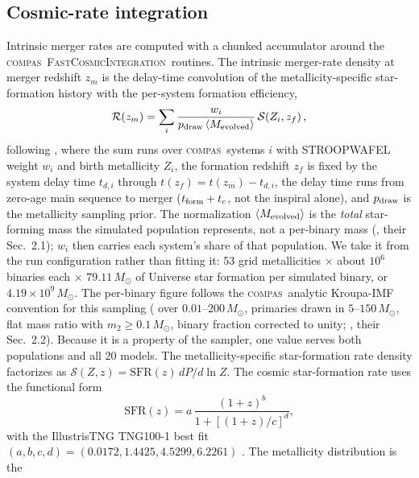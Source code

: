 \documentclass[twocolumn,apj]{openjournal}
\newcommand{\Msun}{M_\odot}
\newcommand{\compas}{\textsc{compas}}
\newcommand{\fci}{\textsc{FastCosmicIntegration}}
\begin{document}
\subsection{Cosmic-rate integration} \label{sec:cosmicrate}

Intrinsic merger rates are computed with a chunked accumulator around the
\compas\ \fci\ routines. The intrinsic merger-rate density at merger redshift
$z_m$ is the delay-time convolution of the metallicity-specific star-formation
history with the per-system formation efficiency,
\begin{equation}
\mathcal{R}(z_m) = \sum_i \frac{w_i}{p_{\rm draw}\,\langle M_{\rm evolved}\rangle}\,
\mathcal{S}\!\left(Z_i, z_f\right),
\label{eq:rate}
\end{equation}
following \citet[their Eq.~1]{neijssel2019}, where the sum runs over \compas\
systems $i$ with STROOPWAFEL weight $w_i$ and birth metallicity $Z_i$, the
formation redshift $z_f$ is fixed by the system delay time $t_{d,i}$ through
$t(z_f) = t(z_m) - t_{d,i}$, the delay time runs from zero-age main sequence to
merger ($t_{\rm form} + t_c$, not the inspiral alone), and $p_{\rm draw}$ is the
metallicity sampling prior. The normalization $\langle M_{\rm evolved}\rangle$
is the \emph{total} star-forming mass the simulated population represents, not a
per-binary mass (\citealt{neijssel2019}, their Sec.~2.1); $w_i$ then carries each
system's share of that population. We take it from the run configuration rather
than fitting it: 53 grid metallicities $\times$ about $10^{6}$ binaries each
\citep[][their Table~1]{broekgaarden2021} $\times$ $79.11\,\Msun$ of Universe
star formation per simulated binary, or $4.19\times10^{9}\,\Msun$. The
per-binary figure follows the \compas\ analytic Kroupa-IMF convention for this
sampling (\citealt{kroupa2001} over $0.01$--$200\,\Msun$, primaries drawn in
$5$--$150\,\Msun$, flat mass ratio with $m_2 \geq 0.1\,\Msun$, binary fraction
corrected to unity; \citealt{broekgaarden2021}, their Sec.~2.2). Because it is a
property of the sampler, one value serves both populations and all 20 models.
The
metallicity-specific star-formation rate density factorizes as
$\mathcal{S}(Z, z) = \mathrm{SFR}(z)\,dP/d\ln Z$. The cosmic star-formation rate
uses the \citet{madau2014} functional form
\begin{equation}
\mathrm{SFR}(z) = a\,\frac{(1+z)^b}{1 + [(1+z)/c]^d},
\label{eq:sfr}
\end{equation}
with the IllustrisTNG TNG100-1 best fit $(a, b, c, d) = (0.0172, 1.4425, 4.5299,
6.2261)$ \citep{levina2026}. The metallicity distribution is the
\end{document}

